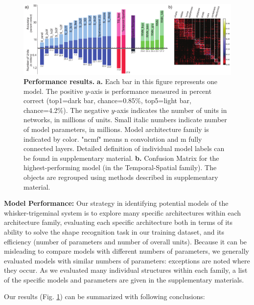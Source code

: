 \begin{figure}
\FigCenter
\includegraphics [width=\DefaultFigSize\linewidth]{figures/results.pdf}
\vspace{-3mm}
\caption{\footnotesize{\textbf{Performance results.} \textbf{a.} Each bar in this figure represents one model. The positive $y$-axis is performance measured in percent correct (top1=dark bar, chance=0.85\%, top5=light bar, chance=4.2\%).  The negative $y$-axis indicates the number of units in networks, in millions of units.  Small italic numbers indicate number of model parameters, in millions. Model architecture family is indicated by color. "ncmf" means n convolution and m fully connected layers. Detailed definition of individual model labels can be found in supplementary material. \textbf{b.} Confusion Matrix for the highest-performing model (in the Temporal-Spatial family). The objects are regrouped using methods described in supplementary material.}~\label{fig_main}}
\vspace{-5mm}
\end{figure}

\textbf{Model Performance:} 
Our strategy in identifying potential models of the whisker-trigeminal system is to explore many specific architectures within each architecture family, evaluating each specific architecture both in terms of its ability to solve the shape recognition task in our training dataset, and its efficiency (number of parameters and number of overall units).
Because it can be misleading to compare models with different numbers of parameters, we generally evaluated models with similar numbers of parameters: exceptions are noted where they occur.
As we evaluated many individual structures within each family, a list of the specific models and parameters are given in the supplementary materials.

Our results (Fig. \ref{fig_main}) can be summarized with following conclusions:

